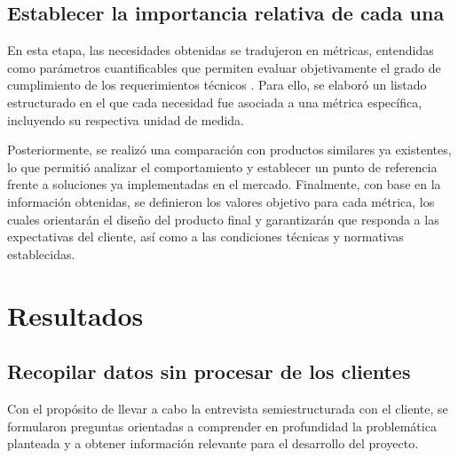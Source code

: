 \documentclass[../../DocumentoCompleto.tex]{subfiles}
\begin{document}
  
  \subsection{Establecer la importancia relativa de cada una}
    En esta etapa, las necesidades obtenidas se tradujeron en métricas, entendidas como parámetros cuantificables que permiten evaluar objetivamente el grado de cumplimiento de los requerimientos técnicos \parencite[pp.~71--91]{Ulrich2020}. Para ello, se elaboró un listado estructurado en el que cada necesidad fue asociada a una métrica específica, incluyendo su respectiva unidad de medida.

    Posteriormente, se realizó una comparación con productos similares ya existentes, lo que permitió analizar el comportamiento y establecer un punto de referencia frente a soluciones ya implementadas en el mercado. Finalmente, con base en la información obtenidas, se definieron los valores objetivo para cada métrica, los cuales orientarán el diseño del producto final y garantizarán que responda a las expectativas del cliente, así como a las condiciones técnicas y normativas establecidas.
    

\section{Resultados}
  \subsection{Recopilar datos sin procesar de los clientes}
  Con el propósito de llevar a cabo la entrevista semiestructurada con el cliente, se formularon preguntas orientadas a comprender en profundidad la problemática planteada y a obtener información relevante para el desarrollo del proyecto.
\end{document}
